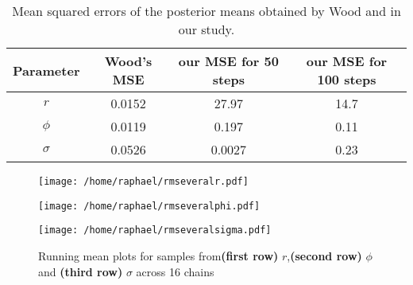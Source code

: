 \documentclass{article}
\begin{document}
	\begin{table}[htb]
		\centering
		\vspace{5mm}
		\begin{tabular}{c|c|c|c}
			Parameter & Wood's MSE & our MSE for 50 steps & our MSE for 100 steps\\ \hline
			$r$ & 0.0152 & 27.97 & 14.7 \\ \hline
			$\phi$ & 0.0119 & 0.197 & 0.11\\ \hline
			$\sigma$ & 0.0526 &  0.0027 & 0.23 \\ \hline
		\end{tabular}
		\caption{Mean squared errors of the posterior means obtained by Wood and in our study.}
		\label{table:mse}
		\vspace{5mm}
	\end{table}
	
	\begin{figure}[htb]
		\centering
		\begin{minipage}{0.6\textwidth}
			\centering
			\texttt{[image: /home/raphael/rmseveralr.pdf]}
		\end{minipage}
		\begin{minipage}{0.6\textwidth}
			\centering
			\texttt{[image: /home/raphael/rmseveralphi.pdf]}
		\end{minipage}
		\begin{minipage}{0.6\textwidth}
			\centering
			\texttt{[image: /home/raphael/rmseveralsigma.pdf]}
		\end{minipage}
		\caption{Running mean plots for samples from\textbf{(first row)} $r$,\textbf{(second row)} $\phi$ and \textbf{(third row)} $\sigma$ across 16 chains}
		\label{fig:rm}
	\end{figure}

\clearpage

	
{}
\end{document}
